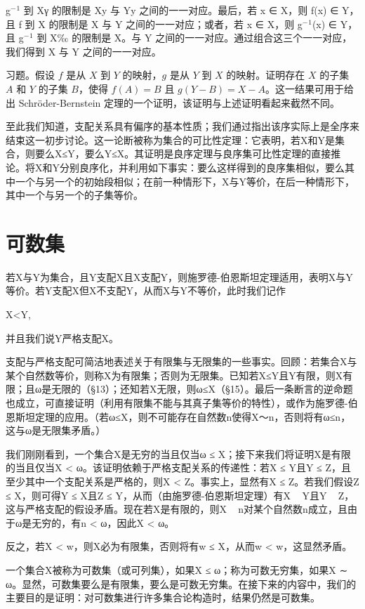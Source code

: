 \documentclass[12pt,a4paper]{ctexbook}
\theoremstyle{definition}
\theoremstyle{remark}
\begin{document}
{g$^{-}$$^{1}$ 到 Xγ 的限制是 Xy 与 Yy 之间的一一对应。最后，若 x ∈ X，则 f(x) ∈ Y，且 f 到 X 的限制是 X 与 Y 之间的一一对应；或者，若 x ∈ X，则 g$^{-}$$^{1}$(x) ∈ Y，且 g$^{-}$$^{1}$ 到 X‰ 的限制是 X。与 Y 之间的一一对应。通过组合这三个一一对应，我们得到 X 与 Y 之间的一一对应。

习题。假设 \( f \) 是从 \( X \) 到 \( Y \) 的映射，\( g \) 是从 \( Y \) 到 \( X \) 的映射。证明存在 \( X \) 的子集 \( A \) 和 \( Y \) 的子集 \( B \)，使得 \( f(A) = B \) 且 \( g(Y - B) = X - A \)。这一结果可用于给出 Schröder-Bernstein 定理的一个证明，该证明与上述证明看起来截然不同。

至此我们知道，支配关系具有偏序的基本性质；我们通过指出该序实际上是全序来结束这一初步讨论。这一论断被称为集合的可比性定理：它表明，若X和Y是集合，则要么X≤Y，要么Y≤X。其证明是良序定理与良序集可比性定理的直接推论。将X和Y分别良序化，并利用如下事实：要么这样得到的良序集相似，要么其中一个与另一个的初始段相似；在前一种情形下，X与Y等价，在后一种情形下，其中一个与另一个的子集等价。


\chapter{可数集}

若X与Y为集合，且Y支配X且X支配Y，则施罗德-伯恩斯坦定理适用，表明X与Y等价。若Y支配X但X不支配Y，从而X与Y不等价，此时我们记作

X<Y,

并且我们说Y严格支配X。

支配与严格支配可简洁地表述关于有限集与无限集的一些事实。回顾：若集合X与某个自然数等价，则称X为有限集；否则为无限集。已知若X≤Y且Y有限，则X有限；且ω是无限的（§13）；还知若X无限，则ω≤X（§15）。最后一条断言的逆命题也成立，可直接证明（利用有限集不能与其真子集等价的特性），或作为施罗德-伯恩斯坦定理的应用。（若ω≤X，则不可能存在自然数n使得X～n，否则将有ω≤n，这与ω是无限集矛盾。）

我们刚刚看到，一个集合X是无穷的当且仅当ω ≤ X；接下来我们将证明X是有限的当且仅当X < ω。该证明依赖于严格支配关系的传递性：若X ≤ Y且Y ≤ Z，且至少其中一个支配关系是严格的，则X < Z。事实上，显然有X ≤ Z。若我们假设Z ≤ X，则可得Y ≤ X且Z ≤ Y，从而（由施罗德-伯恩斯坦定理）有X ~ Y且Y ~ Z，这与严格支配的假设矛盾。现在若X是有限的，则X ~ n对某个自然数n成立，且由于ω是无穷的，有n < ω，因此X < ω。

反之，若X < w，则X必为有限集，否则将有w ≤ X，从而w < w，这显然矛盾。

一个集合X被称为可数集（或可列集），如果X ≤ ω；称为可数无穷集，如果X ∼ ω。显然，可数集要么是有限集，要么是可数无穷集。在接下来的内容中，我们的主要目的是证明：对可数集进行许多集合论构造时，结果仍然是可数集。

}
\end{document}
